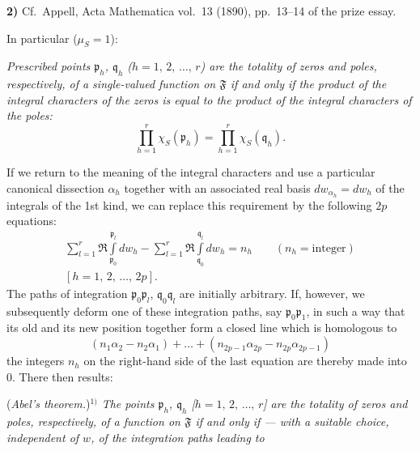 \documentclass{article}
\begin{document}
\textbf{2)} Cf.\ Appell, Acta Mathematica vol.~13 (1890), pp.~13--14 of the prize essay.

In particular ($\mu_S = 1$):

\emph{Prescribed points $\mathfrak{p}_h$, $\mathfrak{q}_h$ ($h = 1, \, 2, \, \dots, \, r$) are the totality of zeros and poles, respectively, of a single-valued function on $\mathfrak{F}$ if and only if the product of the integral characters of the zeros is equal to the product of the integral characters of the poles:}
\[ \prod_{h=1}^r \chi_S(\mathfrak{p}_h) = \prod_{h=1}^r \chi_S(\mathfrak{q}_h). \]

If we return to the meaning of the integral characters and use a particular canonical dissection $\alpha_h$ together with an associated real basis $dw_{\alpha_h} = dw_h$ of the integrals of the 1st kind, we can replace this requirement by the following $2p$ equations:
\[ \begin{gathered}
\sum_{l=1}^r \Re \int\limits_{\mathfrak{p}_0}^{\mathfrak{p}_l} dw_h - \sum_{l=1}^r \Re \int\limits_{\mathfrak{q}_0}^{\mathfrak{q}_l} dw_h = n_h \qquad (n_h = \text{integer}) \\
[h = 1, \, 2, \, \dots, \, 2p].
\end{gathered} \]
The paths of integration $\mathfrak{p}_0 \mathfrak{p}_l$, $\mathfrak{q}_0 \mathfrak{q}_l$ are initially arbitrary. If, however, we subsequently deform one of these integration paths, say $\mathfrak{p}_0 \mathfrak{p}_1$, in such a way that its old and its new position together form a closed line which is homologous to
\[ (n_1 \alpha_2 - n_2 \alpha_1) + \dots + (n_{2p-1} \alpha_{2p} - n_{2p} \alpha_{2p-1}) \]
the integers $n_h$ on the right-hand side of the last equation are thereby made into $0$. There then results:

(\emph{Abel's theorem.})${}^{1)}$ \emph{The points $\mathfrak{p}_h$, $\mathfrak{q}_h$ [$h = 1, \, 2, \, \dots, \, r$] are the totality of zeros and poles, respectively, of a function on $\mathfrak{F}$ if and only if --- with a suitable choice, independent of $w$, of the integration paths leading to}
\end{document}
